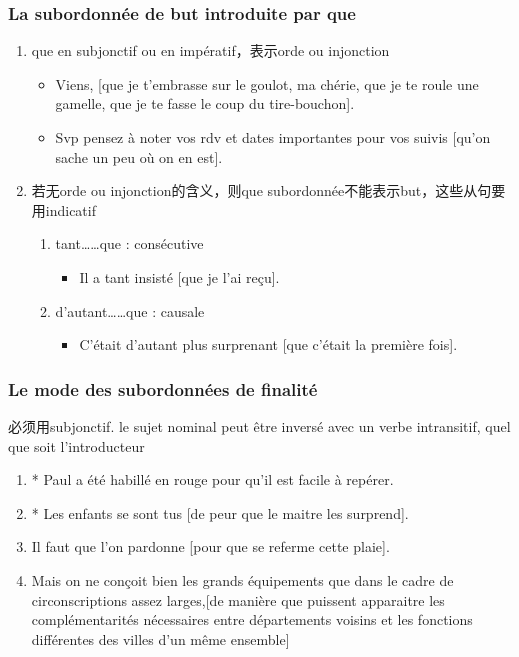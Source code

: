 \documentclass[UTF8]{report}
\begin{document}
\subsubsection{La subordonnée de but introduite par que}
\begin{enumerate}
    \item que en subjonctif ou en impératif，表示orde ou injonction
    \begin{itemize}
        \item Viens, [que je t’embrasse sur le goulot, ma chérie, que je te roule une gamelle, que je te fasse le coup du tire-bouchon].
        \item Svp pensez à noter vos rdv et dates importantes pour vos suivis [qu’on sache un peu où on en est].
    \end{itemize}
    \item 若无orde ou injonction的含义，则que subordonnée不能表示but，这些从句要用indicatif
    \begin{enumerate}
        \item tant……que : consécutive
        \begin{itemize}
            \item Il a tant insisté [que je l’ai reçu].
        \end{itemize}
        \item d’autant……que : causale
        \begin{itemize}
            \item C’était d’autant plus surprenant [que c’était la première fois].
        \end{itemize}
    \end{enumerate}
\end{enumerate}


\subsubsection{Le mode des subordonnées de finalité}
必须用subjonctif. le sujet nominal peut être inversé avec un verbe intransitif, quel que soit l’introducteur
\begin{enumerate}
    \item * Paul a été habillé en rouge pour qu’il est facile à repérer.
    \item * Les enfants se sont tus [de peur que le maitre les surprend].
    \item Il faut que l’on pardonne [pour que se referme cette plaie].
    \item Mais on ne conçoit bien les grands équipements que dans le cadre de circonscriptions assez larges,[de manière que puissent apparaitre les complémentarités nécessaires entre départements voisins et les fonctions différentes des villes d’un même ensemble]
\end{enumerate}
\end{document}
